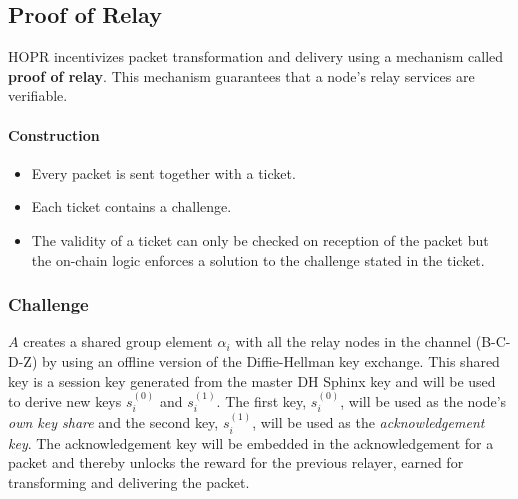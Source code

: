 \subsection{Proof of Relay}
\label{sec:proofofrelay}

HOPR incentivizes packet transformation and delivery using a mechanism called
\textbf{proof of relay}. This mechanism guarantees that a node's relay services are
verifiable.

\paragraph{Construction}

\begin{itemize}
    \item Every packet is sent together with a ticket.
    \item Each ticket contains a challenge.
    \item The validity of a ticket can only be checked on reception of the
        packet but the on-chain logic enforces a solution to the challenge
        stated in the ticket.

\end{itemize}

\subsubsection{Challenge}

$A$ creates a shared group element $\alpha_i$ with all the relay nodes in the channel (B-C-D-Z) by using an offline version of the Diffie-Hellman key exchange. This shared key is a session key generated from the master DH Sphinx key and will be used to derive new keys $s_i^{(0)}$ and $s_{i}^{(1)}$. 
The first key, $s_i^{(0)}$, will be used as the node's \textit{own key share} and the second key, $s_i^{(1)}$, will be used as the \textit{acknowledgement key}. The acknowledgement key will be embedded in the acknowledgement for a packet and thereby unlocks the reward for the previous relayer, earned for transforming and delivering the packet.
